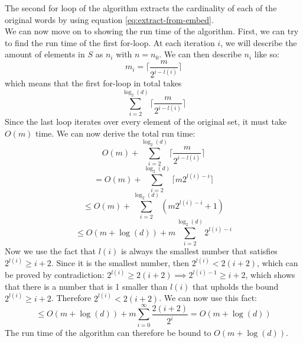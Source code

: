 The second for loop of the algorithm extracts the cardinality of each of the original words by using equation \ref{eq:extract-from-embed}.\\
We can now move on to showing the run time of the algorithm. 
First, we can try to find the run time of the first for-loop. At each iteration $i$, we will describe the amount of elements in $S$ as $n_i$ with $n=n_0$. We can then describe $n_i$ like so:
\begin{equation}
    m_i=\lceil \frac{m}{2^{i-l(i)}} \rceil
\end{equation}
which means that the first for-loop in total takes
$$\sum_{i=2}^{\log_2(d)}\lceil \frac{m}{2^{i-l(i)}} \rceil$$
Since the last loop iterates over every element of the original set, it must take $O(m)$ time. We can now derive the total run time:
$$O(m) + \sum_{i=2}^{\log_2(d)}\lceil \frac{m}{2^{i-l(i)}} \rceil$$
$$=O(m) + \sum_{i=2}^{\log_2(d)}\lceil m2^{l(i)-i} \rceil$$
$$\leq O(m) + \sum_{i=2}^{\log_2(d)}(m2^{l(i)-i} + 1)$$
$$\leq O(m + \log(d)) + m\sum_{i=2}^{\log_2(d)}2^{l(i)-i}$$
Now we use the fact that $l(i)$ is always the smallest number that satisfies $2^{l(i)} \geq i + 2$. Since it is the smallest number, then $2^{l(i)} < 2(i+2)$, which can be proved by contradiction: $2^{l(i)} \geq 2(i+2) \implies 2^{l(i)-1} \geq i+2$, which shows that there is a number that is 1 smaller than $l(i)$ that upholds the bound $2^{l(i)} \geq i + 2$. Therefore $2^{l(i)} < 2(i+2)$. We can now use this fact:
$$\leq O(m + \log(d)) + m\sum_{i=0}^{\infty}\frac{2(i+2)}{2^{i}} = O(m+\log(d))$$
The run time of the algorithm can therefore be bound to $O(m + \log(d))$.
